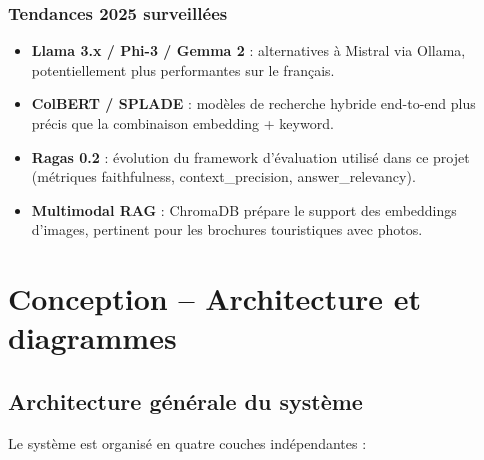 \documentclass[12pt,a4paper]{report}
\begin{document}
\subsection{Tendances 2025 surveill\'{e}es}

\begin{itemize}[leftmargin=*]
  \item \textbf{Llama 3.x / Phi-3 / Gemma 2} : alternatives \`{a} Mistral via Ollama,
        potentiellement plus performantes sur le fran\c{c}ais.
  \item \textbf{ColBERT / SPLADE} : mod\`{e}les de recherche hybride end-to-end plus pr\'{e}cis
        que la combinaison embedding + keyword.
  \item \textbf{Ragas 0.2} : \'{e}volution du framework d'\'{e}valuation utilis\'{e} dans ce projet
        (m\'{e}triques faithfulness, context\_precision, answer\_relevancy).
  \item \textbf{Multimodal RAG} : ChromaDB pr\'{e}pare le support des embeddings d'images,
        pertinent pour les brochures touristiques avec photos.
\end{itemize}

\chapter{Conception -- Architecture et diagrammes}

\section{Architecture g\'{e}n\'{e}rale du syst\`{e}me}

Le syst\`{e}me est organis\'{e} en quatre couches ind\'{e}pendantes :
\end{document}

